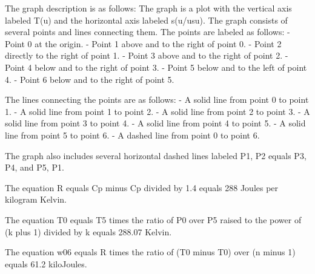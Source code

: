The graph description is as follows: The graph is a plot with the vertical axis labeled T(u) and the horizontal axis labeled s(u/usu). The graph consists of several points and lines connecting them. The points are labeled as follows:
- Point 0 at the origin.
- Point 1 above and to the right of point 0.
- Point 2 directly to the right of point 1.
- Point 3 above and to the right of point 2.
- Point 4 below and to the right of point 3.
- Point 5 below and to the left of point 4.
- Point 6 below and to the right of point 5.

The lines connecting the points are as follows:
- A solid line from point 0 to point 1.
- A solid line from point 1 to point 2.
- A solid line from point 2 to point 3.
- A solid line from point 3 to point 4.
- A solid line from point 4 to point 5.
- A solid line from point 5 to point 6.
- A dashed line from point 0 to point 6.

The graph also includes several horizontal dashed lines labeled P1, P2 equals P3, P4, and P5, P1.

The equation R equals Cp minus Cp divided by 1.4 equals 288 Joules per kilogram Kelvin.

The equation T0 equals T5 times the ratio of P0 over P5 raised to the power of (k plus 1) divided by k equals 288.07 Kelvin.

The equation w06 equals R times the ratio of (T0 minus T0) over (n minus 1) equals 61.2 kiloJoules.